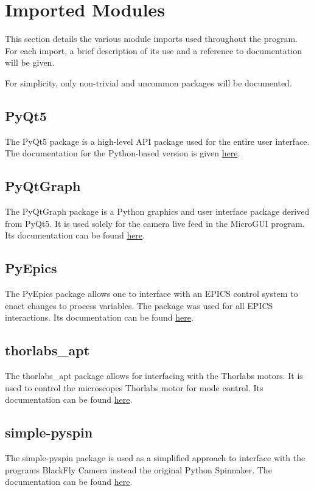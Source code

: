 \documentclass[a4paper, 12pt]{report}
\begin{document}
    
    \section{Imported Modules}
    
    This section details the various module imports used throughout the program. For each import, a brief description of its use and a reference to documentation will be given.
    
    For simplicity, only non-trivial and uncommon packages will be documented.
    
    \subsection{PyQt5}
    
    The PyQt5 package is a high-level API package used for the entire user interface. The documentation for the Python-based version is given \href{https://doc.bccnsoft.com/docs/PyQt5/}{here}.
    
    \subsection{PyQtGraph}
    
    The PyQtGraph package is a Python graphics and user interface package derived from PyQt5. It is used solely for the camera live feed in the MicroGUI program. Its documentation can be found \href{https://pyqtgraph.readthedocs.io/en/latest/}{here}.
    
    \subsection{PyEpics}
    
    The PyEpics package allows one to interface with an EPICS control system to enact changes to process variables. The package was used for all EPICS interactions. Its documentation can be found \href{https://pyepics.github.io/pyepics/overview.html}{here}.
    
    \subsection{thorlabs\_apt}
    
    The thorlabs\_apt package allows for interfacing with the Thorlabs motors. It is used to control the microscopes Thorlabs motor for mode control. Its documentation can be found \href{https://github.com/qpit/thorlabs_apt}{here}.

    \subsection{simple-pyspin}
    
    The simple-pyspin package is used as a simplified approach to interface with the programs BlackFly Camera instead the original Python Spinnaker. The documentation can be found \href{https://klecknerlab.github.io/simple_pyspin/}{here}.
\end{document}
